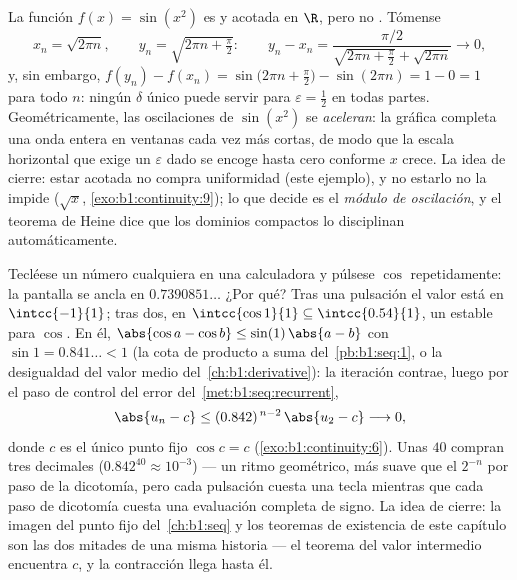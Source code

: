 \begin{example}\label{ex:b1:continuity:sinx2}
La función $f(x) = \sin(x^2)$ es  y acotada en $\R$, pero no
. Tómense
\[
x_n = \sqrt{2\pi n}, \qquad y_n = \sqrt{2\pi n + \tfrac\pi2}:
\qquad
y_n - x_n = \frac{\pi/2}{\sqrt{2\pi n + \frac\pi2} +
\sqrt{2\pi n}} \longrightarrow 0 ,
\]
y, sin embargo,
$f(y_n) - f(x_n) = \sin\bigl(2\pi n + \frac\pi2\bigr) - \sin(2\pi n)
= 1 - 0 = 1$ para todo $n$: ningún $\delta$ único puede servir para
$\varepsilon = \frac12$ en todas partes. Geométricamente, las
oscilaciones de $\sin(x^2)$ se \emph{aceleran}: la gráfica completa
una onda entera en ventanas cada vez más cortas, de modo que la
escala horizontal que exige un $\varepsilon$ dado se encoge hasta
cero conforme $x$ crece. La idea de cierre: estar acotada no compra
uniformidad (este ejemplo), y no estarlo no la impide ($\sqrt x$,
\cref{exo:b1:continuity:9}); lo que decide es el \emph{módulo de
oscilación}, y el teorema de Heine dice que los dominios compactos lo
disciplinan automáticamente.
\end{example}

\begin{example}\label{ex:b1:continuity:cositeration}
Tecléese un número cualquiera en una calculadora y púlsese $\cos$
repetidamente: la pantalla se ancla en $0.7390851\dots$ ¿Por qué?
Tras una pulsación el valor está en $\intcc{-1}{1}$; tras dos, en
$\intcc{\cos 1}{1} \subseteq \intcc{0.54}{1}$, un  estable
para $\cos$. En él, $\abs{\cos a - \cos b} \leq \sin(1)\,\abs{a - b}$
con $\sin 1 = 0.841\dots < 1$ (la cota de producto a suma
del~\cref{pb:b1:seq:1}, o la desigualdad del valor medio
del~\cref{ch:b1:derivative}): la iteración contrae, luego por el paso
de control del error del~\cref{met:b1:seq:recurrent},
\[
\abs{u_n - c} \leq (0.842)^{\,n-2}\,\abs{u_2 - c}
\longrightarrow 0 ,
\]
donde $c$ es el único punto fijo $\cos c = c$
(\cref{exo:b1:continuity:6}). Unas $40$  compran tres
decimales ($0.842^{40} \approx 10^{-3}$) --- un ritmo geométrico, más
suave que el $2^{-n}$ por paso de la dicotomía, pero cada pulsación
cuesta una tecla mientras que cada paso de dicotomía cuesta una
evaluación completa de signo. La idea de cierre: la imagen del punto
fijo del~\cref{ch:b1:seq} y los teoremas de existencia de este
capítulo son las dos mitades de una misma historia --- el teorema del
valor intermedio encuentra $c$, y la contracción llega hasta él.
\end{example}

